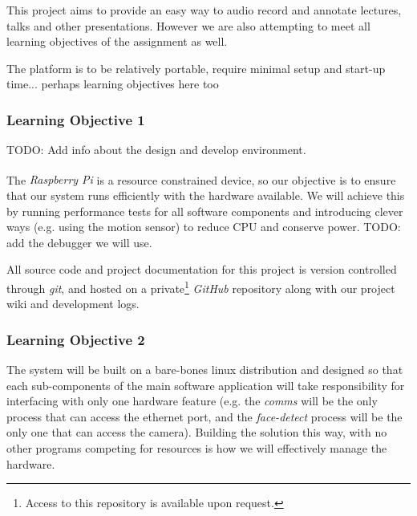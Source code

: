 \documentclass[11pt,a4paper,titlepage]{report}
\newcommand{\rpi}{\textit{Raspberry Pi\textsuperscript{\textregistered}}}
\begin{document}
This project aims to provide an easy way to audio record and annotate lectures, talks and other presentations. However we are also attempting to meet all learning objectives of the assignment as well.

{\color{red}The platform is to be relatively portable, require minimal setup and start-up time... perhaps learning objectives here too}


\subsubsection{Learning Objective 1}


{\color{red} TODO: Add info about the design and develop environment.}

The \rpi\xspace is a resource constrained device, so our objective is to ensure that our system runs efficiently with the hardware available. We will achieve this by running performance tests for all software components and introducing clever ways (e.g. using the motion sensor) to reduce CPU and conserve power. {\color{red} TODO: add the debugger we will use.}

All source code and project documentation for this project is version controlled through \textit{git}, and hosted on a private\footnote{Access to this repository is available upon request.} \textit{GitHub} repository along with our project wiki and development logs.

\subsubsection{Learning Objective 2}


The system will be built on a bare-bones linux distribution and designed so that each sub-components of the main software application will take responsibility for interfacing with only one hardware feature (e.g. the \textit{comms} will be the only process that can access the ethernet port, and the \textit{face-detect} process will be the only one that can access the camera). Building the solution this way, with no other programs competing for resources is how we will effectively manage the hardware.
\end{document}
